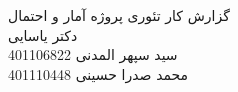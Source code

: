 \Huge
\begin{center}
	گزارش کار تئوری پروژه آمار و احتمال
	\\
	دکتر یاسایی\\
	\vspace{4cm}
	سید سپهر المدنی
	401106822\\
	\vspace{1cm}
	محمد صدرا حسینی
	401110448\\
\end{center}


